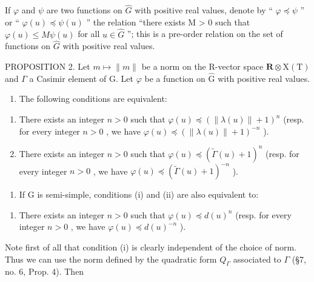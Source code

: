 If \(\varphi\) and \(\psi\) are two functions on \(\hat{G}\) with positive real values, denote by `` \(\varphi \preccurlyeq \psi\) '' or `` \(\varphi(u) \preccurlyeq \psi(u)\) '' the relation ``there exists M \textgreater{} 0 such that \(\varphi(u) \leq M\psi(u)\) for all \(u \in \hat{G}\) ''; this is a pre-order relation on the set of functions on \(\hat{G}\) with positive real values.

PROPOSITION 2. Let \(m \mapsto \|m\|\) be a norm on the R-vector space \(\mathbf{R} \otimes \mathrm{X(T)}\) and \(\Gamma\) a Casimir element of G. Let \(\varphi\) be a function on \(\hat{\mathrm{G}}\) with positive real values.

\begin{enumerate}
\def\labelenumi{\alph{enumi})}
\tightlist
\item
  The following conditions are equivalent:
\end{enumerate}

\begin{enumerate}
\def\labelenumi{(\roman{enumi})}
\item
  There exists an integer \(n > 0\) such that \(\varphi(u) \preccurlyeq (\|\lambda(u)\| + 1)^n\) (resp. for every integer \(n > 0\) , we have \(\varphi(u) \preccurlyeq (\|\lambda(u)\| + 1)^{-n}\) ).
\item
  There exists an integer \(n > 0\) such that \(\varphi(u) \preccurlyeq (\tilde{\Gamma}(u) + 1)^n\) (resp. for every integer \(n > 0\) , we have \(\varphi(u) \preccurlyeq (\tilde{\Gamma}(u) + 1)^{-n}\) ).
\end{enumerate}

\begin{enumerate}
\def\labelenumi{\alph{enumi})}
\setcounter{enumi}{1}
\tightlist
\item
  If \(\mathrm{G}\) is semi-simple, conditions (i) and (ii) are also equivalent to:
\end{enumerate}

\begin{enumerate}
\def\labelenumi{(\roman{enumi})}
\setcounter{enumi}{2}
\tightlist
\item
  There exists an integer \(n > 0\) such that \(\varphi(u) \preccurlyeq d(u)^n\) (resp. for every integer \(n > 0\) , we have \(\varphi(u) \preccurlyeq d(u)^{-n}\) ).
\end{enumerate}

Note first of all that condition (i) is clearly independent of the choice of norm. Thus we can use the norm defined by the quadratic form \(Q_{\varGamma}\) associated to \(\varGamma\) (§7, no. 6, Prop. 4). Then

